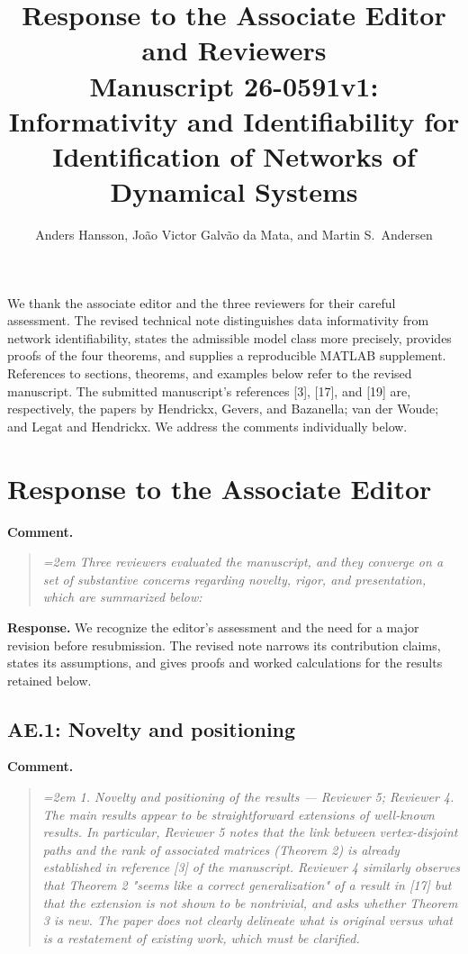 \documentclass[11pt]{article}
\title{Response to the Associate Editor and Reviewers\\
\large Manuscript 26-0591v1: Informativity and Identifiability for Identification of Networks of Dynamical Systems}
\author{Anders Hansson, Jo\~ao Victor Galv\~ao da Mata, and Martin S.~Andersen}
\date{}
\begin{document}
\maketitle

We thank the associate editor and the three reviewers for their careful
assessment. The revised technical note distinguishes data informativity from
network identifiability, states the admissible model class more precisely,
provides proofs of the four theorems, and supplies a reproducible MATLAB
supplement. References to sections, theorems, and examples below refer to the
revised manuscript. The submitted manuscript's references [3], [17], and [19]
are, respectively, the papers by Hendrickx, Gevers, and Bazanella; van der
Woude; and Legat and Hendrickx. We address the comments individually below.

\section*{Response to the Associate Editor}

\textbf{Comment.}
\begin{quote}\itshape\emergencystretch=2em
Three reviewers evaluated the manuscript, and they converge on a set of substantive concerns regarding novelty, rigor, and presentation, which are summarized below:
\end{quote}

\textbf{Response.} We recognize the editor's assessment and the need for a major revision before resubmission. The revised note narrows its contribution claims, states its assumptions, and gives proofs and worked calculations for the results retained below.

\subsection*{AE.1: Novelty and positioning}
\textbf{Comment.}
\begin{quote}\itshape\emergencystretch=2em
1. Novelty and positioning of the results --- Reviewer 5; Reviewer 4. The main results appear to be straightforward extensions of well-known results. In particular, Reviewer 5 notes that the link between vertex-disjoint paths and the rank of associated matrices (Theorem 2) is already established in reference [3] of the manuscript. Reviewer 4 similarly observes that Theorem 2 "seems like a correct generalization" of a result in [17] but that the extension is not shown to be nontrivial, and asks whether Theorem 3 is new. The paper does not clearly delineate what is original versus what is a restatement of existing work, which must be clarified.
\end{quote}
\end{document}

